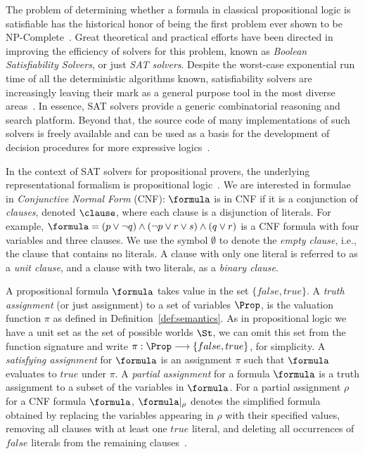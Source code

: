 The problem of determining whether a formula in classical propositional logic is
satisfiable has the historical honor of being the first problem ever shown to be
NP-Complete~\cite{Cook}. Great theoretical and practical efforts have been
directed in improving the efficiency of solvers for this problem, known as
\emph{Boolean Satisfiability Solvers}, or just \emph{SAT solvers}. Despite the
worst-case exponential run time of all the deterministic algorithms known,
satisfiability solvers are increasingly leaving their mark as a general purpose
tool in the most diverse areas~\cite{satchapter}. In essence, SAT solvers
provide a generic combinatorial reasoning and search platform. Beyond that, the
source code of many implementations of such solvers is freely available and can
be used as a basis for the development of decision procedures for more
expressive logics~\cite{giunchiglia2002sat}.

In the context of SAT solvers for propositional provers, the underlying
representational formalism is propositional logic~\cite{satchapter}. We are
interested in formulae in \emph{Conjunctive Normal Form} (CNF): $\formula$ is in
CNF if it is a conjunction of \emph{clauses}, denoted $\clause$, where each
clause is a disjunction of literals. For example, $\formula = (p \lor \neg q)
\land (\neg p \lor r \lor s) \land (q \lor r)$ is a CNF formula with four
variables and three clauses.  We use the symbol $\emptyset$ to denote the
\emph{empty clause}, i.e., the clause that contains no literals. A clause with
only one literal is referred to as a \emph{unit clause}, and a clause with two
literals, as a \emph{binary clause}.

A propositional formula $\formula$ takes value in the set $\{false, true\}$. A
\emph{truth assignment} (or just assignment) to a set of variables $\Prop$, is
the valuation function $\pi$ as defined in Definition~\ref{def:semantics}. As in
propositional logic we have a unit set as the set of possible worlds $\St$, we
can omit this set from the function signature and write $\pi : \Prop \longrightarrow
\{false,true\}$, for simplicity. A \emph{satisfying assignment} for $\formula$
is an assignment $\pi$ such that $\formula$ evaluates to $true$ under $\pi$.  A
\emph{partial assignment} for a formula $\formula$ is a truth assignment to a
subset of the variables in $\formula$. For a partial assignment $\rho$ for a CNF
formula $\formula$, $\formula|_\rho$ denotes the simplified formula obtained by
replacing the variables appearing in $\rho$ with their specified values, removing
all clauses with at least one $true$ literal, and deleting all occurrences of
$false$ literals from the remaining clauses~\cite{satchapter}.

